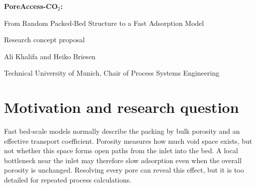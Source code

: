 \documentclass[10pt,a4paper]{article}
\begin{document}
\begin{center}
{\Large\bfseries\color{titleblue}PoreAccess-CO$_2$:\par
From Random Packed-Bed Structure to a Fast Adsorption Model\par}
\vspace{0.55em}
{\normalsize Research concept proposal\par}
\vspace{0.2em}
{\small Ali Khalifa and Heiko Briesen\par
Technical University of Munich, Chair of Process Systems Engineering\par}
\end{center}
\vspace{0.25em}

\begin{abstract}
Packed beds are used for CO$_2$ adsorption, gas purification and drying. Even
when two beds contain the same monodisperse beads and have nearly the same porosity,
their void pathways can differ. These differences may control how easily gas
enters the bed and reaches the adsorbent, but they are hidden in conventional
one-dimensional models. This project will connect three model levels. DEM will
generate mechanically realistic zeolite beds. A pore-network model will resolve
diffusion and adsorption in each void structure. A simple homogeneous model
will then reproduce each uptake curve using one fitted effective diffusivity.
The central test is whether a physically defined inlet-accessibility descriptor
can predict this diffusivity for a new packing. The expected outcome is an
interpretable structure-to-model closure: particle geometry in, fast transient
adsorption prediction out. The study deliberately isolates diffusion-driven
adsorption; no CFD or imposed gas flow is required in the first step.
\end{abstract}

\section{Motivation and research question}
Fast bed-scale models normally describe the packing by bulk porosity and an
effective transport coefficient. Porosity measures how much void space exists,
but not whether this space forms open paths from the inlet into the bed. A local
bottleneck near the inlet may therefore slow adsorption even when the overall
porosity is unchanged. Resolving every pore can reveal this effect, but it is
too detailed for repeated process calculations.
\end{document}
